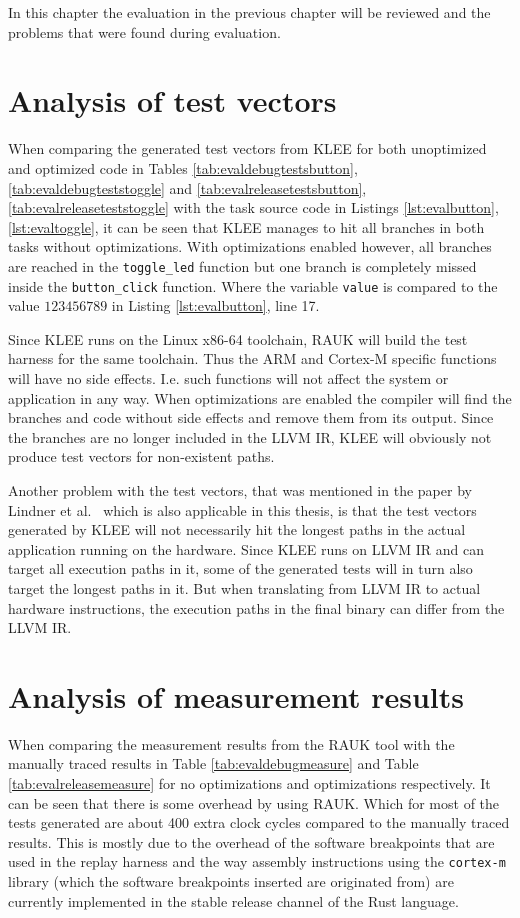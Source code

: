 In this chapter the evaluation in the previous chapter will be reviewed
and the problems that were found during evaluation.

\section{Analysis of test vectors}
When comparing the generated test vectors from KLEE for both unoptimized and
optimized code in Tables \ref{tab:evaldebugtestsbutton},
\ref{tab:evaldebugteststoggle} and \ref{tab:evalreleasetestsbutton},
\ref{tab:evalreleaseteststoggle} with the task source code in Listings
\ref{lst:evalbutton}, \ref{lst:evaltoggle}, it can be seen that KLEE manages to
hit all branches in both tasks without optimizations. With optimizations
enabled however, all branches are reached in the \texttt{toggle\_led} function
but one branch is completely missed inside the \texttt{button\_click} function.
Where the variable \texttt{value} is compared to the value $123456789$ in
Listing \ref{lst:evalbutton}, line 17.

Since KLEE runs on the Linux x86-64 toolchain, RAUK will build the test harness
for the same toolchain. Thus the ARM and Cortex-M specific functions will have
no side effects. I.e. such functions will not affect the system or application
in any way. When optimizations are enabled the compiler will find the branches
and code without side effects and remove them from its output. Since the
branches are no longer included in the LLVM IR, KLEE will obviously not
produce test vectors for non-existent paths.

Another problem with the test vectors, that was mentioned in the paper by
Lindner et al.\ \cite{lindner} which is also applicable in this thesis, is that
the test vectors generated by KLEE will not necessarily hit the longest paths
in the actual application running on the hardware. Since KLEE runs on LLVM IR
and can target all execution paths in it, some of the generated tests will
in turn also target the longest paths in it. But when translating from LLVM
IR to actual hardware instructions, the execution paths in the final binary
can differ from the LLVM IR. 

\section{Analysis of measurement results}
When comparing the measurement results from the RAUK tool with the manually
traced results in Table \ref{tab:evaldebugmeasure} and Table
\ref{tab:evalreleasemeasure} for no optimizations and optimizations
respectively. It can be seen that there is some overhead by using RAUK. Which
for most of the tests generated are about 400 extra clock cycles compared to
the manually traced results. This is mostly due to the overhead of the software
breakpoints that are used in the replay harness and the way assembly
instructions using the \texttt{cortex-m} library (which the software
breakpoints inserted are originated from) are currently implemented in the
stable release channel of the Rust language.

